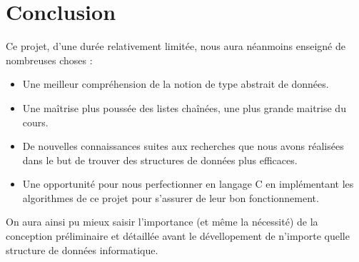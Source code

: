 \documentclass[a4paper, titlepage]{livret} %
\begin{document}


	
	\chapter*{Conclusion}
		Ce projet, d'une durée relativement limitée, nous aura néanmoins enseigné de nombreuses choses :
		\begin{itemize}
			\item Une meilleur compréhension de la notion de type abstrait de données.
			\item Une maîtrise plus poussée des listes chaînées, une plus grande maitrise du cours.
			\item De nouvelles connaissances suites aux recherches que nous avons réalisées dans le but de trouver des structures de données plus efficaces.
			\item Une opportunité pour nous perfectionner en langage C en implémentant les algorithmes de ce projet pour s'assurer de leur bon fonctionnement.
		\end{itemize}

		On aura ainsi pu mieux saisir l'importance (et même la nécessité) de la conception préliminaire et détaillée avant le dévellopement de n'importe quelle structure de données informatique.
\end{document}
